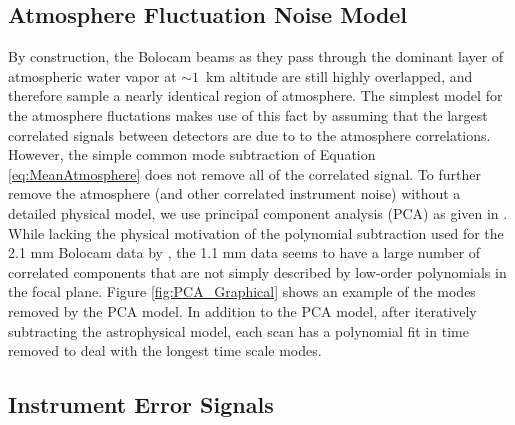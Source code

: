 \documentclass{emulateapj}
\begin{document}
\subsection{Atmosphere Fluctuation Noise Model}

By construction, the Bolocam beams as they pass through the dominant
layer of atmospheric water vapor at $\sim1$~km altitude are still
highly overlapped, and therefore sample a nearly identical region of
atmosphere.  The simplest model for the atmosphere fluctations makes
use of this fact by assuming that the largest correlated signals
between detectors are due to to the atmosphere correlations.  However,
the simple common mode subtraction of Equation \ref{eq:MeanAtmosphere}
does not remove all of the correlated signal.  To further remove the
atmosphere (and other correlated instrument noise) without a detailed
physical model, we use principal component analysis (PCA) as given in
\citet{laurent05}.
While lacking the physical motivation of the polynomial subtraction
used for the 2.1 mm Bolocam data by \citet{sayers09b}, the 1.1 mm data
seems to have a large number of correlated components that are not
simply described by low-order polynomials in the focal plane.  Figure
\ref{fig:PCA_Graphical} shows an example of the modes removed by the
PCA model.  In addition to the PCA model, after iteratively
subtracting the astrophysical model, each scan has a polynomial fit in
time removed to deal with the longest time scale modes.


\subsection{Instrument Error Signals}
\end{document}
